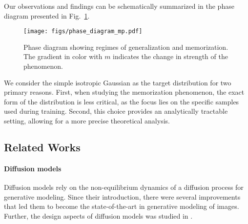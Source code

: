 Our observations and findings can be schematically summarized in the phase diagram presented in Fig.~\ref{fig:phase_diagram}. 
\begin{figure}[ht]
    \centering
    \texttt{[image: figs/phase\_diagram\_mp.pdf]}
    \caption{Phase diagram showing regimes of generalization and memorization. The gradient in color with $m$ indicates the change in strength of the phenomenon.}
    \label{fig:phase_diagram}
\end{figure}

We consider the simple isotropic Gaussian as the target distribution for two primary reasons. First, when studying the memorization phenomenon, the exact form of the distribution is less critical, as the focus lies on the specific samples used during training. Second, this choice provides an analytically tractable setting, allowing for a more precise theoretical analysis.
\subsection{Related Works}
\paragraph{Diffusion models} Diffusion models \cite{sohl-dickstein_deep_2015,song_generative_2019,ho_denoising_2020,song_score-based_2020} rely on the non-equilibrium dynamics of a diffusion process for generative modeling. Since their introduction, there were several improvements \cite{dhariwal_diffusion_2021,rombach_high-resolution_2022,ho_classifier-free_2021,nichol_glide_2022} that led them to become the state-of-the-art in generative modeling of images.  Further, the design aspects of diffusion models was studied in \cite{karras_elucidating_2022}.
